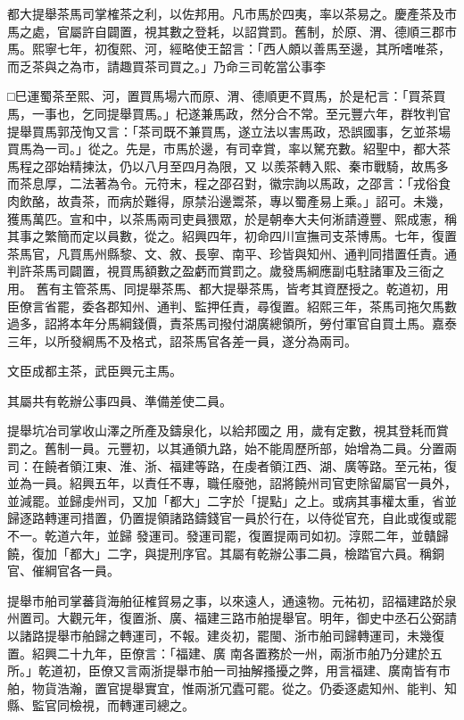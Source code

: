 \begin{pinyinscope}
 都大提舉茶馬司掌榷茶之利，以佐邦用。凡市馬於四夷，率以茶易之。慶產茶及市馬之處，官屬許自闢置，視其數之登耗，以詔賞罰。舊制，於原、渭、德順三郡市馬。熙寧七年，初復熙、河，經略使王韶言：「西人頗以善馬至邊，其所嗜唯茶，而乏茶與之為市，請趣買茶司買之。」乃命三司乾當公事李



 □巳運蜀茶至熙、河，置買馬場六而原、渭、德順更不買馬，於是杞言：「買茶買馬，一事也，乞同提舉買馬。」杞遂兼馬政，然分合不常。至元豐六年，群牧判官提舉買馬郭茂恂又言：「茶司既不兼買馬，遂立法以害馬政，恐誤國事，乞並茶場買馬為一司。」從之。先是，市馬於邊，有司幸賞，率以駑充數。紹聖中，都大茶馬程之邵始精揀汰，仍以八月至四月為限，又
 以羨茶轉入熙、秦市戰騎，故馬多而茶息厚，二法著為令。元符末，程之邵召對，徽宗詢以馬政，之邵言：「戎俗食肉飲酪，故貴茶，而病於難得，原禁沿邊鬻茶，專以蜀產易上乘。」詔可。未幾，獲馬萬匹。宣和中，以茶馬兩司吏員猥眾，於是朝奉大夫何淅請遵豐、熙成憲，稱其事之繁簡而定以員數，從之。紹興四年，初命四川宣撫司支茶博馬。七年，復置茶馬官，凡買馬州縣黎、文、敘、長寧、南平、珍皆與知州、通判同措置任責。通判許茶馬司闢置，視買馬額數之盈虧而賞罰之。歲發馬綱應副屯駐諸軍及三衙之用。
 舊有主管茶馬、同提舉茶馬、都大提舉茶馬，皆考其資歷授之。乾道初，用臣僚言省罷，委各郡知州、通判、監押任責，尋復置。紹熙三年，茶馬司拖欠馬數過多，詔將本年分馬綱錢價，責茶馬司撥付湖廣總領所，勞付軍官自買土馬。嘉泰三年，以所發綱馬不及格式，詔茶馬官各差一員，遂分為兩司。



 文臣成都主茶，武臣興元主馬。



 其屬共有乾辦公事四員、準備差使二員。



 提舉坑冶司掌收山澤之所產及鑄泉化，以給邦國之
 用，歲有定數，視其登耗而賞罰之。舊制一員。元豐初，以其通領九路，始不能周歷所部，始增為二員。分置兩司：在饒者領江東、淮、浙、福建等路，在虔者領江西、湖、廣等路。至元祐，復並為一員。紹興五年，以責任不專，職任廢弛，詔將饒州司官吏除留屬官一員外，並減罷。並歸虔州司，又加「都大」二字於「提點」之上。或病其事權太重，省並歸逐路轉運司措置，仍置提領諸路鑄錢官一員於行在，以侍從官充，自此或復或罷不一。乾道六年，並歸
 發運司。發運司罷，復置提兩司如初。淳熙二年，並贛歸饒，復加「都大」二字，與提刑序官。其屬有乾辦公事二員，檢踏官六員。稱銅官、催綱官各一員。



 提舉市舶司掌蕃貨海舶征榷貿易之事，以來遠人，通遠物。元祐初，詔福建路於泉州置司。大觀元年，復置浙、廣、福建三路市舶提舉官。明年，御史中丞石公弼請以諸路提舉市舶歸之轉運司，不報。建炎初，罷閩、浙市舶司歸轉運司，未幾復置。紹興二十九年，臣僚言：「福建、廣
 南各置務於一州，兩浙市舶乃分建於五所。」乾道初，臣僚又言兩浙提舉市舶一司抽解搔擾之弊，用言福建、廣南皆有市舶，物貨浩瀚，置官提舉實宜，惟兩浙冗蠹可罷。從之。仍委逐處知州、能判、知縣、監官同檢視，而轉運司總之。




\end{pinyinscope}
